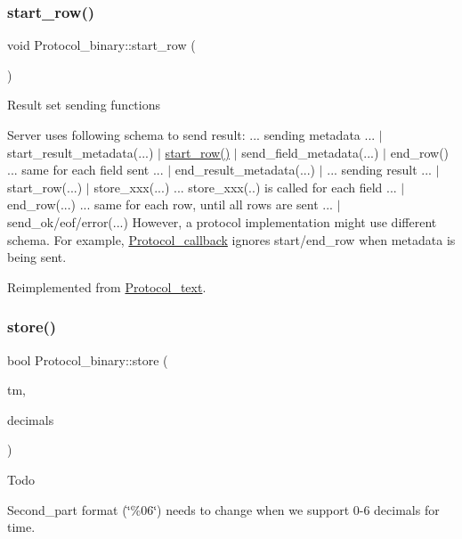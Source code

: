\subsubsection{\texorpdfstring{start\+\_\+row()}{start\_row()}}
{\footnotesize\ttfamily void Protocol\+\_\+binary\+::start\+\_\+row (\begin{DoxyParamCaption}{ }\end{DoxyParamCaption})\hspace{0.3cm}{\ttfamily [virtual]}}

Result set sending functions

Server uses following schema to send result\+: ... sending metadata ... $\vert$ start\+\_\+result\+\_\+metadata(...) $\vert$ \mbox{\hyperlink{classProtocol__binary_ae3111e401880cd6d68b3587e2fbb8091}{start\+\_\+row()}} $\vert$ send\+\_\+field\+\_\+metadata(...) $\vert$ end\+\_\+row() ... same for each field sent ... $\vert$ end\+\_\+result\+\_\+metadata(...) $\vert$ ... sending result ... $\vert$ start\+\_\+row(...) $\vert$ store\+\_\+xxx(...) ... store\+\_\+xxx(..) is called for each field ... $\vert$ end\+\_\+row(...) ... same for each row, until all rows are sent ... $\vert$ send\+\_\+ok/eof/error(...) However, a protocol implementation might use different schema. For example, \mbox{\hyperlink{classProtocol__callback}{Protocol\+\_\+callback}} ignores start/end\+\_\+row when metadata is being sent. 

Reimplemented from \mbox{\hyperlink{classProtocol__text_a72aad9182cd1313187654ba88712d54a}{Protocol\+\_\+text}}.

\mbox{\label{classProtocol__binary_a6e11523fc3c24f22a333f39fd778f840}} 
\subsubsection{\texorpdfstring{store()}{store()}}
{\footnotesize\ttfamily bool Protocol\+\_\+binary\+::store (\begin{DoxyParamCaption}\item[{M\+Y\+S\+Q\+L\+\_\+\+T\+I\+ME $\ast$}]{tm,  }\item[{uint}]{decimals }\end{DoxyParamCaption})\hspace{0.3cm}{\ttfamily [virtual]}}

\begin{DoxyRefDesc}{Todo}
\item[\mbox{\hyperlink{todo__todo000058}{Todo}}]Second\+\_\+part format (\char`\"{}\%06\char`\"{}) needs to change when we support 0-\/6 decimals for time. \end{DoxyRefDesc}


